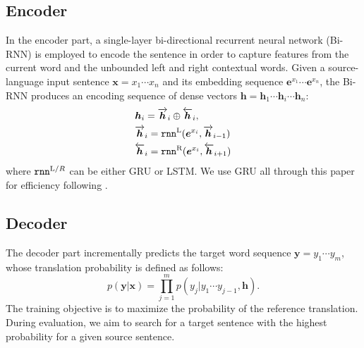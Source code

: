 \documentclass[11pt,a4paper]{article}
\begin{document}
\begin{CJK}{UTF8}{gbsn}
\subsection{Encoder}
In the encoder part,
a single-layer bi-directional recurrent neural network (Bi-RNN) is employed to encode the sentence in order to
capture features from the current word and the unbounded left and right contextual words.
Given a source-language input sentence $\bm{x} = x_1 \cdots x_n$ and its embedding sequence $\bm{e}^{x_1} \cdots \bm{e}^{x_n}$,
the Bi-RNN produces an encoding sequence of dense vectors $\bm{h} = \bm{h}_1 \cdots \bm{h}_i  \cdots \bm{h}_n$:
\begin{equation}
\begin{split}
&\bm{h}_i =  \overrightarrow{\bm{h}}_i \oplus \overleftarrow{\bm{h}}_i,  \\
& \overrightarrow{\bm{h}}_i = \texttt{rnn}^{\textup L}(\bm{e}^{x_i}, \overrightarrow{\bm{h}}_{i-1}) \\
& \overleftarrow{\bm{h}}_i =  \texttt{rnn}^{\textup R}(\bm{e}^{x_i}, \overleftarrow{\bm{h}}_{i+1})  \\
\end{split}
\end{equation}
where
$\texttt{rnn}^{\textup L/R}$ can be either GRU \cite{cho-EtAl:2014:EMNLP2014} or LSTM.
We use GRU all through this paper for efficiency following .

\subsection{Decoder}
The decoder part incrementally predicts the target word sequence $\bm{y} = y_1 \cdots y_m$, whose translation probability is defined as follows:
\begin{equation}
p(\bm{y}|\bm{x}) = \prod_{j=1}^{m} p(y_j | y_1 \cdots y_{j-1}, \bm{h}).
\end{equation}
The training objective is to maximize the probability of the reference translation.
During evaluation, we aim to search for a target sentence with the highest probability for a given source sentence.


\end{CJK}
\end{document}
